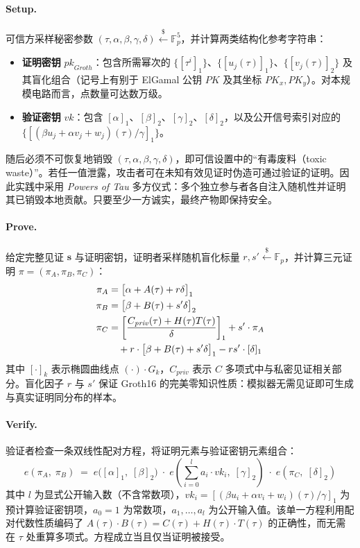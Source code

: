 \paragraph{Setup.}
可信方采样秘密参数 $(\tau, \alpha, \beta, \gamma, \delta) \overset{\$}{\leftarrow} \mathbb{F}_p^5$，并计算两类结构化参考字符串：
\begin{itemize}
    \item \textbf{证明密钥} $\mathit{pk}_{\mathit{Groth}}$：包含所需幂次的 $\{[\tau^i]_1\}$、$\{[u_j(\tau)]_1\}$、$\{[v_j(\tau)]_2\}$ 及其盲化组合（记号上有别于 ElGamal 公钥 $\mathit{PK}$ 及其坐标 $PK_x,PK_y$）。对本规模电路而言，点数量可达数万级。
    \item \textbf{验证密钥} $\mathit{vk}$：包含 $[\alpha]_1$、$[\beta]_2$、$[\gamma]_2$、$[\delta]_2$，以及公开信号索引对应的 $\{[(\beta u_j + \alpha v_j + w_j)(\tau)/\gamma]_1\}$。
\end{itemize}

随后必须不可恢复地销毁 $(\tau, \alpha, \beta, \gamma, \delta)$，即可信设置中的“有毒废料（toxic waste）”。若任一值泄露，攻击者可在未知有效见证时伪造可通过验证的证明。因此实践中采用 \emph{Powers of Tau} 多方仪式：多个独立参与者各自注入随机性并证明其已销毁本地贡献。只要至少一方诚实，最终产物即保持安全。

\paragraph{Prove.}
给定完整见证 $\mathbf{s}$ 与证明密钥，证明者采样随机盲化标量 $r, s' \overset{\$}{\leftarrow} \mathbb{F}_p$，并计算三元证明 $\pi = (\pi_A, \pi_B, \pi_C)$：
\begin{align}
    \pi_A &= \bigl[\alpha + A(\tau) + r\delta\bigr]_1 \\
    \pi_B &= \bigl[\beta + B(\tau) + s'\delta\bigr]_2 \\
    \pi_C &= \left[\frac{C_{\mathit{priv}}(\tau) + H(\tau)T(\tau)}{\delta}\right]_1 + s' \cdot \pi_A \\
          &\quad + r \cdot \bigl[\beta + B(\tau) + s'\delta\bigr]_1 - rs' \cdot [\delta]_1 \notag
\end{align}
其中 $[\cdot]_k$ 表示椭圆曲线点 $(\cdot) \cdot G_k$，$C_{\mathit{priv}}$ 表示 $C$ 多项式中与私密见证相关部分。盲化因子 $r$ 与 $s'$ 保证 Groth16 的完美零知识性质：模拟器无需见证即可生成与真实证明同分布的样本。

\paragraph{Verify.}
验证者检查一条双线性配对方程，将证明元素与验证密钥元素组合：
\begin{equation}
    e(\pi_A,\; \pi_B) \;=\; e\bigl([\alpha]_1,\; [\beta]_2\bigr) \;\cdot\; e\!\left(\sum_{i=0}^{l} a_i \cdot \mathit{vk}_i,\; [\gamma]_2\right) \;\cdot\; e(\pi_C,\; [\delta]_2)
\end{equation}
其中 $l$ 为显式公开输入数（不含常数项），$\mathit{vk}_i = [(\beta u_i + \alpha v_i + w_i)(\tau)/\gamma]_1$ 为预计算验证密钥项，$a_0 = 1$ 为常数项，$a_1,\dots,a_l$ 为公开输入值。该单一方程利用配对代数性质编码了 $A(\tau) \cdot B(\tau) = C(\tau) + H(\tau) \cdot T(\tau)$ 的正确性，而无需在 $\tau$ 处重算多项式。方程成立当且仅当证明被接受。

